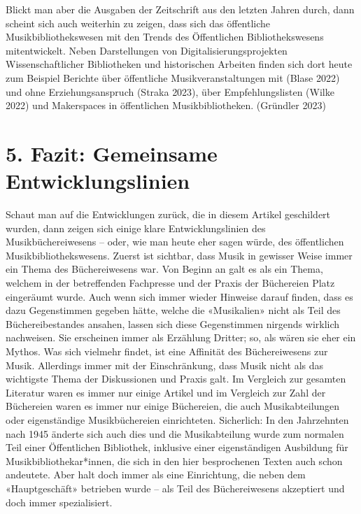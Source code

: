 \documentclass[a4paper,
fontsize=11pt,
oneside,
numbers=noperiodatend,
parskip=half-,
bibliography=totoc,
final
]{scrartcl}
\begin{document}
Blickt man aber die Ausgaben der Zeitschrift aus den letzten Jahren
durch, dann scheint sich auch weiterhin zu zeigen, dass sich das
öffentliche Musikbibliothekswesen mit den Trends des Öffentlichen
Bibliothekswesens mitentwickelt. Neben Darstellungen von
Digitalisierungsprojekten Wissenschaftlicher Bibliotheken und
historischen Arbeiten finden sich dort heute zum Beispiel Berichte über
öffentliche Musikveranstaltungen mit (Blase 2022) und ohne
Erziehungsanspruch (Straka 2023), über Empfehlungslisten (Wilke 2022)
und Makerspaces in öffentlichen Musikbibliotheken. (Gründler 2023)

\hypertarget{fazit-gemeinsame-entwicklungslinien}{%
\section{5. Fazit: Gemeinsame
Entwicklungslinien}\label{fazit-gemeinsame-entwicklungslinien}}

Schaut man auf die Entwicklungen zurück, die in diesem Artikel
geschildert wurden, dann zeigen sich einige klare Entwicklungslinien des
Musikbüchereiwesens -- oder, wie man heute eher sagen würde, des
öffentlichen Musikbibliothekswesens. Zuerst ist sichtbar, dass Musik in
gewisser Weise immer ein Thema des Büchereiwesens war. Von Beginn an
galt es als ein Thema, welchem in der betreffenden Fachpresse und der
Praxis der Büchereien Platz eingeräumt wurde. Auch wenn sich immer
wieder Hinweise darauf finden, dass es dazu Gegenstimmen gegeben hätte,
welche die «Musikalien» nicht als Teil des Büchereibestandes ansahen,
lassen sich diese Gegenstimmen nirgends wirklich nachweisen. Sie
erscheinen immer als Erzählung Dritter; so, als wären sie eher ein
Mythos. Was sich vielmehr findet, ist eine Affinität des Büchereiwesens
zur Musik. Allerdings immer mit der Einschränkung, dass Musik nicht als
das wichtigste Thema der Diskussionen und Praxis galt. Im Vergleich zur
gesamten Literatur waren es immer nur einige Artikel und im Vergleich
zur Zahl der Büchereien waren es immer nur einige Büchereien, die auch
Musikabteilungen oder eigenständige Musikbüchereien einrichteten.
Sicherlich: In den Jahrzehnten nach 1945 änderte sich auch dies und die
Musikabteilung wurde zum normalen Teil einer Öffentlichen Bibliothek,
inklusive einer eigenständigen Ausbildung für Musikbibliothekar*innen,
die sich in den hier besprochenen Texten auch schon andeutete. Aber halt
doch immer als eine Einrichtung, die neben dem «Hauptgeschäft» betrieben
wurde -- als Teil des Büchereiwesens akzeptiert und doch immer
spezialisiert.
\end{document}
